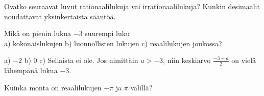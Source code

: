 \begin{tehtavasivu}
\begin{tehtava}
Ovatko seuraavat luvut rationaalilukuja vai irrationaalilukuja? Kunkin desimaalit
noudattavat yksinkertaista sääntöä.
\begin{vastaus}
\end{vastaus}
\end{tehtava}

\begin{tehtava}%
\begin{vastaus}
\end{vastaus}
\end{tehtava}


\begin{tehtava}
Mikä on pienin lukua $-3$ suurempi luku \\
a) kokonaislukujen b) luonnollisten lukujen c) reaalilukujen joukossa?
\begin{vastaus}
a) $-2$ b) $0$ c) Sellaista ei ole. Jos nimittäin $a > -3$, niin keskiarvo
$\frac{-3+a}{2}$ on vielä lähempänä lukua $-3$. 
\end{vastaus}
\end{tehtava}

\begin{tehtava}
Kuinka monta 
on reaalilukujen \(-\pi\) ja \(\pi\) välillä?
\begin{vastaus}
\end{vastaus}
\end{tehtava}


\end{tehtavasivu}
